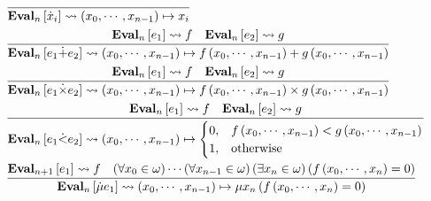 \documentclass[12pt]{paper}
\begin{document}
  \begin{align*}
    & \infer{ \mathbf{Eval}_{n} \left[ \dot{x}_{i} \right] \rightsquigarrow \left( x_{0} , \cdots , x_{n - 1} \right) \mapsto x_{i} }{} \\
    & \infer{ \mathbf{Eval}_{n} \left[ e_{1} \dot{+} e_{2} \right] \rightsquigarrow \left( x_{0}, \cdots , x_{n - 1} \right) \mapsto f \left( x_{0} , \cdots , x_{n - 1} \right) + g \left( x_{0} , \cdots , x_{n - 1} \right) }{ \mathbf{Eval}_{n} \left[ e_{1} \right] \rightsquigarrow f & \mathbf{Eval}_{n} \left[ e_{2} \right] \rightsquigarrow g } \\
    & \infer{ \mathbf{Eval}_{n} \left[ e_{1} \dot{\times} e_{2} \right] \rightsquigarrow \left( x_{0}, \cdots , x_{n - 1} \right) \mapsto f \left( x_{0} , \cdots , x_{n - 1} \right) \times g \left( x_{0} , \cdots , x_{n - 1} \right) }{ \mathbf{Eval}_{n} \left[ e_{1} \right] \rightsquigarrow f & \mathbf{Eval}_{n} \left[ e_{2} \right] \rightsquigarrow g } \\
    & \infer{ \mathbf{Eval}_{n} \left[ e_{1} \dot{<} e_{2} \right] \rightsquigarrow \left( x_{0}, \cdots , x_{n - 1} \right) \mapsto \begin{cases} 0 , & f \left( x_{0} , \cdots , x_{n - 1} \right) < g \left( x_{0} , \cdots , x_{n - 1} \right) \\ 1 , & \mathrm{otherwise} \end{cases} }{ \mathbf{Eval}_{n} \left[ e_{1} \right] \rightsquigarrow f & \mathbf{Eval}_{n} \left[ e_{2} \right] \rightsquigarrow g } \\
    & \infer{ \mathbf{Eval}_{n} \left[ \dot{\mu} e_{1} \right] \rightsquigarrow \left( x_{0}, \cdots , x_{n - 1} \right) \mapsto \mu x_{n} \left( f \left( x_{0} , \cdots , x_{n} \right) = 0 \right) }{ \mathbf{Eval}_{n + 1} \left[ e_{1} \right] \rightsquigarrow f & \left( \forall x_{0} \in \omega \right) \cdots \left( \forall x_{n - 1} \in \omega \right) \left( \exists x_{n} \in \omega \right) \left( f \left( x_{0} , \cdots , x_{n} \right) = 0 \right) } \\
  \end{align*}
\end{document}
